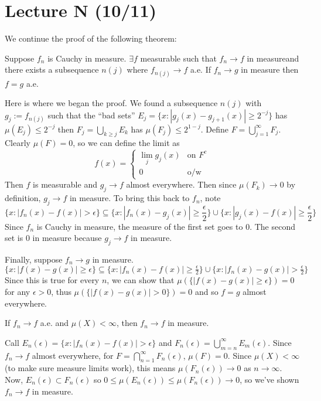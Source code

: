 
\section{Lecture N (10/11)}
We continue the proof of the following theorem:
\begin{theorem}
    Suppose $f_n$ is Cauchy in measure. $\exists f$ measurable such that $f_n \to f$ in measureand there exists
    a subsequence $n(j)$ where $f_{n(j)} \to f$ a.e. If $f_n \to g$ in measure then $f = g$ a.e.
\end{theorem}
Here is where we began the proof. We found a subsequence $n(j)$ with $g_j := f_{n(j)}$ such that
the ``bad sets''
$E_j = \{x: |g_j(x) - g_{j + 1}(x)| \ge 2^{-j}\}$ has $\mu(E_j) \le 2^{-j}$
then $F_j = \bigcup_{k \ge j} E_k$ has $\mu(F_j) \le 2^{1 - j}$. Define $F = \bigcup_{j = 1}^{\infty} F_j$. Clearly
$\mu(F) = 0$, so we can define the limit as 
\[ f(x) = \begin{cases}
    \lim_j g_j(x) & \text{on $F^c$} \\
    0 & \text{o/w}
\end{cases} \]
Then $f$ is measurable and $g_j \to f$ almost everywhere. Then since $\mu(F_k) \to 0$
by definition, $g_j \to f$ in measure. To bring this back to $f_n$, note
\[ \{ x: |f_n(x) - f(x)| > \epsilon \} \subseteq \{x: |f_n(x) - g_j(x)| \ge \frac{\epsilon}{2}\} \cup \{x: |g_j(x) - f(x)| \ge \frac{\epsilon}{2}\} \]
Since $f_n$ is Cauchy in measure, the measure of the first set goes to $0$. The second set is $0$ in measure because $g_j \to f$ in measure.

Finally, suppose $f_n \to g$ in measure. $\{x: |f(x) - g(x)| \ge \epsilon\} \subseteq \{ x: |f_n(x) - f(x)| \ge \frac{\epsilon}{2} \} \cup \{x: |f_n(x) - g(x)| > \frac{\epsilon}{2}\}$
Since this is true for every $n$, we can show that $\mu(\{|f(x) - g(x)| \ge \epsilon\}) = 0$ for any $\epsilon > 0$,
thus $\mu(\{|f(x) - g(x)| > 0\}) = 0$ and so $f = g$ almost everywhere. 

\begin{theorem}
    If $f_n \to f$ a.e. and $\mu(X) < \infty$, then $f_n \to f$ in measure.
\end{theorem}
Call $E_n(\epsilon) = \{x: |f_n(x) - f(x)| > \epsilon\}$ and $F_n(\epsilon) = \bigcup_{m = n}^{\infty} E_m(\epsilon)$.
Since $f_n \to f$ almost everywhere, for $F = \bigcap_{n = 1}^{\infty} F_n(\epsilon)$, $\mu(F) = 0$.
Since $\mu(X) < \infty$ (to make sure measure limits work), this means $\mu(F_n(\epsilon)) \to 0$ as $n \to \infty$.
Now, $E_n(\epsilon) \subset F_n(\epsilon)$ so $0 \le \mu(E_n(\epsilon)) \le \mu(F_n(\epsilon)) \to 0$, so we've shown
$f_n \to f$ in measure.

